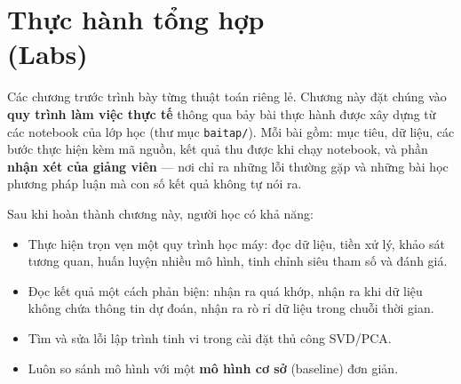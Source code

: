 
\chapter{Thực hành tổng hợp \\ (Labs)}
\label{chap:labs}

Các chương trước trình bày từng thuật toán riêng lẻ. Chương này đặt chúng vào \textbf{quy trình làm việc thực tế} thông qua bảy bài thực hành được xây dựng từ các notebook của lớp học (thư mục \texttt{baitap/}). Mỗi bài gồm: mục tiêu, dữ liệu, các bước thực hiện kèm mã nguồn, kết quả thu được khi chạy notebook, và phần \textbf{nhận xét của giảng viên} --- nơi chỉ ra những lỗi thường gặp và những bài học phương pháp luận mà con số kết quả không tự nói ra.

\noindent Sau khi hoàn thành chương này, người học có khả năng:
\begin{itemize}
    \item Thực hiện trọn vẹn một quy trình học máy: đọc dữ liệu, tiền xử lý, khảo sát tương quan, huấn luyện nhiều mô hình, tinh chỉnh siêu tham số và đánh giá.
    \item Đọc kết quả một cách phản biện: nhận ra quá khớp, nhận ra khi dữ liệu không chứa thông tin dự đoán, nhận ra rò rỉ dữ liệu trong chuỗi thời gian.
    \item Tìm và sửa lỗi lập trình tinh vi trong cài đặt thủ công SVD/PCA.
    \item Luôn so sánh mô hình với một \textbf{mô hình cơ sở} (baseline) đơn giản.
\end{itemize}

